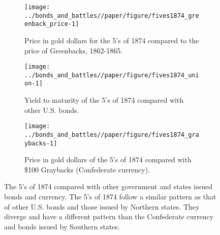 \begin{figure}[!]
  \begin{subfigure}[b]{0.45\linewidth}
    \texttt{[image: ../bonds\_and\_battles//paper/figure/fives1874\_greenback\_price-1]}
  \caption{Price in gold dollars for the 5's of 1874 compared to the price of Greenbacks, 1862-1865.}
  \label{bonds_battles:fig:fives1874_greenbacks}
\end{subfigure}%
\hspace{0.1\linewidth}%
\begin{subfigure}[b]{0.45\linewidth}
    \texttt{[image: ../bonds\_and\_battles//paper/figure/fives1874\_union-1]}
    \caption{Yield to maturity of the 5's of 1874 compared with other U.S. bonds.}
  \label{bonds_battles:fig:fives1874_union}
\end{subfigure}


\begin{subfigure}[b]{0.45\linewidth}
  \texttt{[image: ../bonds\_and\_battles//paper/figure/fives1874\_graybacks-1]}
\caption{Price in gold dollars of the 5's of 1874 compared with \$100 Graybacks (Confederate currency).}
\label{bonds_battles:fig:fives1874_grayback}
\end{subfigure}
\caption[The 5's of 1874 compared with other government and states issued bonds and currency.]{The 5's of 1874 compared with other government and states issued bonds and currency.
  The 5's of 1874 follow a similar pattern as that of other U.S. bonds and those issued by Northern states.
  They diverge and have a different pattern than the Confederate currency and bonds issued by Southern states.
}
\label{bonds_battles:fig:fives1874_compared}
\end{figure}



